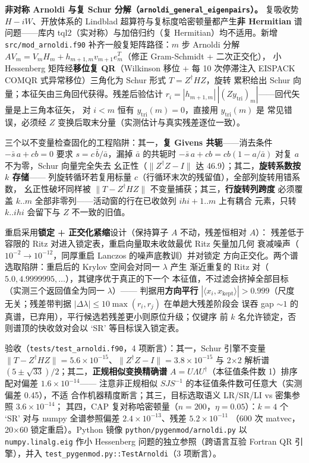 \documentclass[
]{ctexbook}
\begin{document}
\textbf{非对称 Arnoldi 与复 Schur
分解（\texttt{arnoldi\_general\_eigenpairs}）。} 复吸收势
\(H-iW\)、开放体系的 Lindblad 超算符与复标度哈密顿量都产生\textbf{非
Hermitian} 谱问题------库内 tql2（实对称）与加倍归约（复
Hermitian）均不适用。新增 \texttt{src/mod\_arnoldi.f90}
补齐一般复矩阵路径：\(m\) 步 Arnoldi 分解
\(AV_m=V_mH_m+h_{m+1,m}v_{m+1}e_m^T\)（修正 Gram-Schmidt +
二次正交化）， 小 Hessenberg 矩阵经\textbf{移位复 QR}（Wilkinson 移位 +
每 10 次停滞注入 EISPACK COMQR 式异常移位）三角化为 Schur 形式
\(T=Z^\dagger HZ\)，旋转 累积给出 Schur
向量；本征矢由三角回代获得。残差后验估计
\(r_i=|h_{m+1,m}|\,|(Zy_{\mathrm{tri}})_m|\)------回代矢量是上三角本征矢，
对 \(i<m\) 恒有 \(y_{\mathrm{tri}}(m)=0\)，直接用
\(y_{\mathrm{tri}}(m)\) 是 常见错误，必须经 \(Z\)
变换后取末分量（实测估计与真实残差逐位一致）。

三个以不变量检查固化的工程陷阱：其一，\textbf{复 Givens
共轭}------消去条件 \(-\bar s\,a+cb=0\) 要求
\(s=c\,\bar b/\bar a\)，漏掉 \(\bar a\) 的共轭时
\(-\bar s\,a+cb=cb(1-a/\bar a)\) 对复 \(a\) 不为零，Schur 向量完全失去
幺正性（\(\|Z^\dagger Z-I\|\) 达 46.9）；其二，\textbf{旋转系数按 \(k\)
存储}------ 列旋转循环若复用标量
\(c\)（行循环末次的残留值），全部列旋转用错系数， 幺正性破坏同样被
\(\|T-Z^\dagger HZ\|\) 不变量捕获；其三，\textbf{行旋转列跨度} 必须覆盖
\(k..m\) 全部非零列------活动窗的行在已收敛列 \(ihi{+}1..m\) 上有耦合
元素，只转 \(k..ihi\) 会留下与 \(Z\) 不一致的旧值。

重启采用\textbf{锁定 + 正交化紧缩}设计（保持算子 \(A\) 不动，残差恒相对
\(A\)）： 残差低于容限的 Ritz 对进入锁定表，重启向量取未收敛最优 Ritz
矢量加几何 衰减噪声（\(10^{-2}\to10^{-12}\)，同厚重启 Lanczos
的噪声底教训）并对锁定 方向正交化。两个谱选取陷阱：重启后的 Krylov
空间会对同一 \(\lambda\) 产生 渐近重复的 Ritz
对（\(5.0,4.9999995,\ldots\)），其键序优于真正的下一个
本征值，不过滤会挤掉全部目标（实测三个返回值全为同一 \(\lambda\)）------
判据用\textbf{方向平行}
\(|\langle x_i,x_{\mathrm{kept}}\rangle|>0.999\)（尺度 无关；残差带判据
\(|\Delta\lambda|\le10\max(r_i,r_j)\) 在单趟大残差阶段会 误吞 gap
\(\sim1\) 的真谱，已弃用），平行候选若残差更小则原位升级；仅键序 前
\(k\) 名允许锁定，否则谱顶的快收敛对会以 `SR' 等目标误入锁定表。

验收（\texttt{tests/test\_arnoldi.f90}，4 项断言）：其一，Schur
引擎不变量
\(\|T-Z^\dagger HZ\|=5.6\times10^{-15}\)、\(\|Z^\dagger Z-I\|=3.8\times10^{-15}\)
与 2×2 解析谱 \((5\pm\sqrt{33})/2\)；其二，\textbf{正规相似变换精确谱}
\(A=U\Lambda U^\dagger\)（本征值条件数 1）排序配对偏差
\(1.6\times10^{-14}\)------ 注意非正规相似 \(SJS^{-1}\)
的本征值条件数可任意大（实测偏差 0.45），不适
合作机器精度断言；其三，目标选取语义 LR/SR/LI vs 密集参照
\(3.6\times10^{-14}\)； 其四，CAP
复对称哈密顿量（\(n=200\)，\(\eta=0.05\)）：\(k=4\) 个 `SR' 对与 numpy
全谱参照偏差 \(2.4\times10^{-13}\)、残差 \(5.2\times10^{-11}\) （600 次
matvec，20×60 锁定重启）。Python 镜像
\texttt{python/pygenmod/arnoldi.py} 以 \texttt{numpy.linalg.eig} 作小
Hessenberg 问题的独立参照（跨语言互验 Fortran QR 引擎），并入
\texttt{test\_pygenmod.py::TestArnoldi}（3 项断言）。
\end{document}
